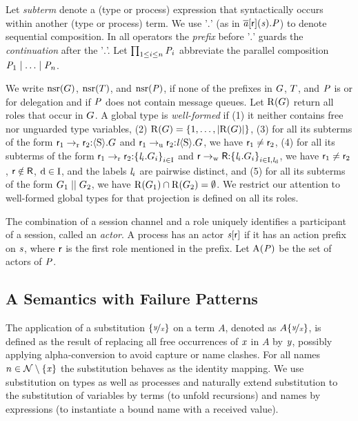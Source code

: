 Let \emph{subterm} denote a (type or process) expression that syntactically occurs within another (type or process) term.
We use '$ . $' (as \eg in $ \PReq{\Chan[a]}{\Role}{\Chan}{\PT} $) to denote sequential composition. In all operators the \emph{prefix} before '$ . $' guards the \emph{continuation} after the '$ . $'.
Let $ \prod_{1 \leq i \leq n} \PT_i $ abbreviate the parallel composition $ \PPar{\PT_1}{\PPar{\ldots}{\PT_n}} $.

We write  $ \Unreliable{\GT} $, $ \Unreliable{\LT} $, and $ \Unreliable{\PT} $, if none of the prefixes in $ \GT $, $ \LT $, and $ \PT $ is \strongR or for delegation and if $ \PT $ does not contain message queues.
Let $ \Roles{\GT} $ return all roles that occur in $ \GT $.
A global type is \emph{well-formed} if
(1) it neither contains free nor unguarded type variables,
(2) $ \Roles{G} = \Set{ 1, \ldots, \Length{\Roles{G}} } $,
(3) for all its subterms of the form $ \GComR{\Role_1}{\Role_2}{\Sort}{\GT} $ and $ \GComU{\Role_1}{\Role_2}{\Label}{\Sort}{\GT} $, we have $ \Role_1 \neq \Role_2 $,
(4) for all its subterms of the form $ \GBranR{\Role_1}{\Role_2}{\Set{ \Label_i.\GT_i }_{i \in \indexSet}} $ and $ \GBranW{\Role}{\Role[R]}{\Set{ \Label_i.\GT_i }_{i \in \indexSet, \LabelD}} $, we have $ \Role_1 \neq \Role_2 $, $ \Role \notin \Role[R] $, $ \default \in \indexSet $, and the labels $ \Label_i $ are pairwise distinct, and
(5) for all its subterms of the form $ \GPar{\GT_1}{\GT_2} $, we have $ \Roles{\GT_1} \cap \Roles{\GT_2} = \emptyset $.
We restrict our attention to well-formed global types for that projection is defined on all its roles.

The combination of a session channel and a role uniquely identifies a participant of a session, called an \emph{actor}. A process has an actor $ \AT{\Chan[s]}{\Role} $ if it has an action prefix on $ \Chan $, where $ \Role $ is the first role mentioned in the prefix.
Let $ \Actors{\PT} $ be the set of actors of $ \PT $.

\subsection{A Semantics with Failure Patterns}
\label{sec:failurePatterns}

The application of a substitution $ \Subst{\Args[y]}{\Args} $ on a term $ A $, denoted as $ A\Subst{\Args[y]}{\Args} $, is defined as the result of replacing all free occurrences of $ \Args $ in $ A $ by $ \Args[y] $, possibly applying alpha-conversion to avoid capture or name clashes. For all names $ n \in \names \setminus \Set{ \Args } $ the substitution behaves as the identity mapping. We use substitution on types as well as processes and naturally extend substitution to the substitution of variables by terms (to unfold recursions) and names by expressions (to instantiate a bound name with a received value).

